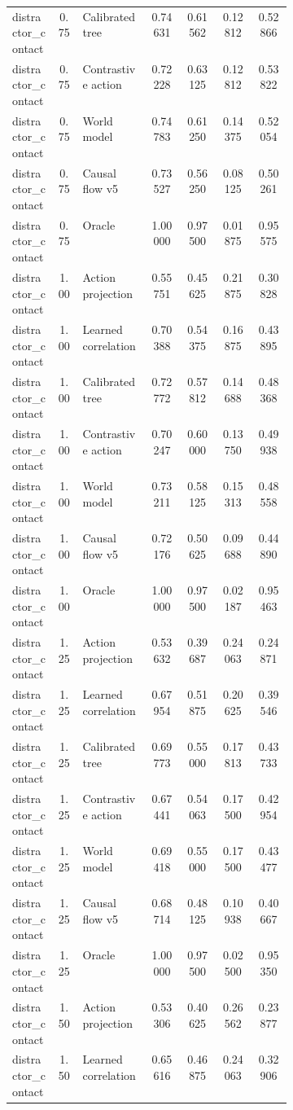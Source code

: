 \documentclass{article}
\begin{document}
\begin{center}
\begin{longtable}{p{0.16\linewidth}cp{0.24\linewidth}cccc}
distractor\_contact & 0.75 & Calibrated tree & 0.74631 & 0.61562 & 0.12812 & 0.52866\\
distractor\_contact & 0.75 & Contrastive action & 0.72228 & 0.63125 & 0.12812 & 0.53822\\
distractor\_contact & 0.75 & World model & 0.74783 & 0.61250 & 0.14375 & 0.52054\\
distractor\_contact & 0.75 & Causal flow v5 & 0.73527 & 0.56250 & 0.08125 & 0.50261\\
distractor\_contact & 0.75 & Oracle & 1.00000 & 0.97500 & 0.01875 & 0.95575\\
distractor\_contact & 1.00 & Action projection & 0.55751 & 0.45625 & 0.21875 & 0.30828\\
distractor\_contact & 1.00 & Learned correlation & 0.70388 & 0.54375 & 0.16875 & 0.43895\\
distractor\_contact & 1.00 & Calibrated tree & 0.72772 & 0.57812 & 0.14688 & 0.48368\\
distractor\_contact & 1.00 & Contrastive action & 0.70247 & 0.60000 & 0.13750 & 0.49938\\
distractor\_contact & 1.00 & World model & 0.73211 & 0.58125 & 0.15313 & 0.48558\\
distractor\_contact & 1.00 & Causal flow v5 & 0.72176 & 0.50625 & 0.09688 & 0.44890\\
distractor\_contact & 1.00 & Oracle & 1.00000 & 0.97500 & 0.02187 & 0.95463\\
distractor\_contact & 1.25 & Action projection & 0.53632 & 0.39687 & 0.24063 & 0.24871\\
distractor\_contact & 1.25 & Learned correlation & 0.67954 & 0.51875 & 0.20625 & 0.39546\\
distractor\_contact & 1.25 & Calibrated tree & 0.69773 & 0.55000 & 0.17813 & 0.43733\\
distractor\_contact & 1.25 & Contrastive action & 0.67441 & 0.54063 & 0.17500 & 0.42954\\
distractor\_contact & 1.25 & World model & 0.69418 & 0.55000 & 0.17500 & 0.43477\\
distractor\_contact & 1.25 & Causal flow v5 & 0.68714 & 0.48125 & 0.10938 & 0.40667\\
distractor\_contact & 1.25 & Oracle & 1.00000 & 0.97500 & 0.02500 & 0.95350\\
distractor\_contact & 1.50 & Action projection & 0.53306 & 0.40625 & 0.26562 & 0.23877\\
distractor\_contact & 1.50 & Learned correlation & 0.65616 & 0.46875 & 0.24063 & 0.32906\\

\end{longtable}
\end{center}
\end{document}
